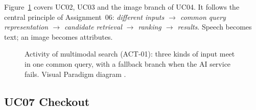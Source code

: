 Figure~\ref{fig:actsearch} covers UC02, UC03 and the image branch of UC04. It follows the central principle of
Assignment~06: \emph{different inputs $\rightarrow$ common query representation $\rightarrow$ candidate retrieval
$\rightarrow$ ranking $\rightarrow$ results}. Speech becomes text; an image becomes attributes.

\begin{figure}[H]
\centering
{}
\caption[Activity of multimodal search (ACT-01)]{Activity of multimodal search (ACT-01): three kinds of input meet in one common query, with a fallback branch when the AI service fails. Visual Paradigm diagram .}\label{fig:c2_activity_search}\label{fig:actsearch}
\end{figure}

\subsection{UC07 Checkout}\label{sec:2.2.3}

